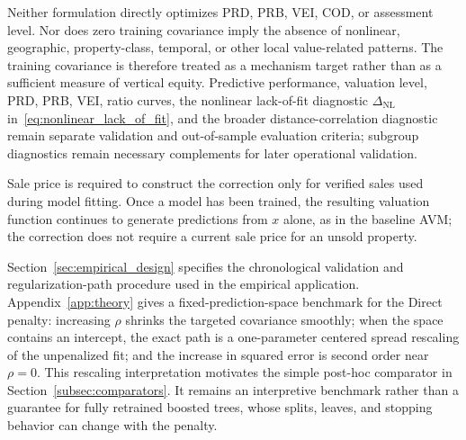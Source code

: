 \documentclass[10pt]{article}
\theoremstyle{definition}
\newcommand{\1}{\mathbf{1}}
\newcommand{\oldtext}[1]{\textcolor{blue}{\sout{#1}}}
\newcommand{\newtext}[1]{\textcolor{impGreen}{#1}}
\begin{document}

{\color{impGreen}Neither formulation directly optimizes PRD, PRB, VEI, COD, or assessment level. Nor does zero training covariance imply the absence of nonlinear, geographic, property-class, temporal, or other local value-related patterns. The training covariance is therefore treated as a mechanism target rather than as a sufficient measure of vertical equity. Predictive performance, valuation level, PRD, PRB, VEI, ratio curves, the nonlinear lack-of-fit diagnostic $\Delta_{\mathrm{NL}}$ in~\eqref{eq:nonlinear_lack_of_fit}, and the broader distance-correlation diagnostic remain separate validation and out-of-sample evaluation criteria; subgroup diagnostics remain necessary complements for later operational validation.}

{Sale price is required to construct the correction only for verified sales used during model fitting. Once a model has been trained, the resulting valuation function continues to generate predictions from $x$ alone, as in the baseline AVM; the correction does not require a current sale price for an unsold property.}

\newtext{Section~\ref{sec:empirical_design} specifies the chronological validation and regularization-path procedure used in the empirical application. Appendix~\ref{app:theory} gives a fixed-prediction-space benchmark for the Direct penalty: increasing $\rho$ shrinks the targeted covariance smoothly; when the space contains an intercept, the exact path is a one-parameter centered spread rescaling of the unpenalized fit; and the increase in squared error is second order near $\rho=0$. This rescaling interpretation motivates the simple post-hoc comparator in Section~\ref{subsec:comparators}. It remains an interpretive benchmark rather than a guarantee for fully retrained boosted trees, whose splits, leaves, and stopping behavior can change with the penalty.}
\end{document}
